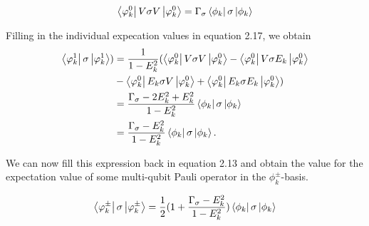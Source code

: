 \begin{equation}
  \bra{\varphi_k^0} V \sigma V \ket{\varphi_k^0} = \Gamma_{\sigma} \bra{\phi_k} \sigma \ket{\phi_k}
\end{equation}

Filling in the individual expecation values in equation 2.17, we obtain
\begin{align*}
  \bra{\varphi_k^1} \sigma \ket{\varphi_k^1}) &= \frac{1}{1-E_k^2} (\bra{\varphi_k^0} V \sigma V \ket{\varphi_k^0} - \bra{\varphi_k^0} V\sigma E_k \ket{\varphi_k^0}\\
  &- \bra{\varphi_k^0} E_k \sigma V \ket{\varphi_k^0} + \bra{\varphi_k^0} E_k \sigma E_k \ket{\varphi_k^0})\\
  &= \frac{\Gamma_{\sigma} - 2 E_k^2 + E_k^2}{1-E_k^2} \bra{\phi_k} \sigma \ket{\phi_k}\\
  &=  \frac{\Gamma_{\sigma} - E_k^2}{1-E_k^2} \bra{\phi_k} \sigma \ket{\phi_k}.
\end{align*}

We can now fill this expression back in equation 2.13 and obtain the value for the expectation value of some multi-qubit Pauli operator in the $\phi^{\pm}_k$-basis.


$$
\bra{\varphi_k^{\pm}} \sigma \ket{\varphi_k^{\pm}} = \frac{1}{2}(1+\frac{\Gamma_{\sigma} - E_k^2}{1-E_k^2})  \bra{\phi_k} \sigma \ket{\phi_k}
$$


